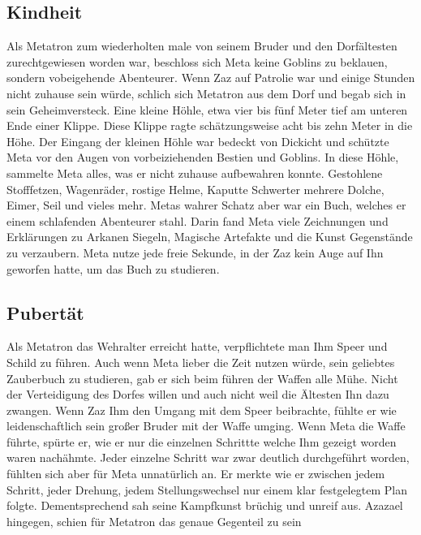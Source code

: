 \documentclass[letterpaper,twocolumn,openany,nodeprecatedcode]{book}
\begin{document}
\subsection{Kindheit}
Als Metatron zum wiederholten male von seinem Bruder und den Dorfältesten zurechtgewiesen worden war, beschloss sich Meta keine Goblins zu beklauen, sondern vobeigehende Abenteurer. Wenn Zaz auf Patrolie war und einige Stunden nicht zuhause sein würde, schlich sich Metatron aus dem Dorf und begab sich in sein Geheimversteck. Eine kleine Höhle, etwa vier bis fünf Meter tief am unteren Ende einer Klippe. Diese Klippe ragte schätzungsweise acht bis zehn Meter in die Höhe. Der Eingang der kleinen Höhle war bedeckt von Dickicht und schützte Meta vor den Augen von vorbeiziehenden Bestien und Goblins. In diese Höhle, sammelte Meta alles, was er nicht zuhause aufbewahren konnte. Gestohlene Stofffetzen, Wagenräder, rostige Helme, Kaputte Schwerter mehrere Dolche, Eimer, Seil und vieles mehr. Metas wahrer Schatz aber war ein Buch, welches er einem schlafenden Abenteurer stahl. Darin fand Meta viele Zeichnungen und Erklärungen zu Arkanen Siegeln, Magische Artefakte und die Kunst Gegenstände zu verzaubern. Meta nutze jede freie Sekunde, in der Zaz kein Auge auf Ihn geworfen hatte, um das Buch zu studieren.

\subsection{Pubertät}
Als Metatron das Wehralter erreicht hatte, verpflichtete man Ihm Speer und Schild zu führen. Auch wenn Meta lieber die Zeit nutzen würde, sein geliebtes Zauberbuch zu studieren, gab er sich beim führen der Waffen alle Mühe. Nicht der Verteidigung des Dorfes willen und auch nicht weil die Ältesten Ihn dazu zwangen. Wenn Zaz Ihm den Umgang mit dem Speer beibrachte, fühlte er wie leidenschaftlich sein großer Bruder mit der Waffe umging. Wenn Meta die Waffe führte, spürte er, wie er nur die einzelnen Schrittte welche Ihm gezeigt worden waren nachähmte. Jeder einzelne Schritt war zwar deutlich durchgeführt worden, fühlten sich aber für Meta unnatürlich an. Er merkte wie er zwischen jedem Schritt, jeder Drehung, jedem Stellungswechsel nur einem klar festgelegtem Plan folgte. Dementsprechend sah seine Kampfkunst brüchig und unreif aus. Azazael hingegen, schien für Metatron das genaue Gegenteil zu sein
\end{document}
